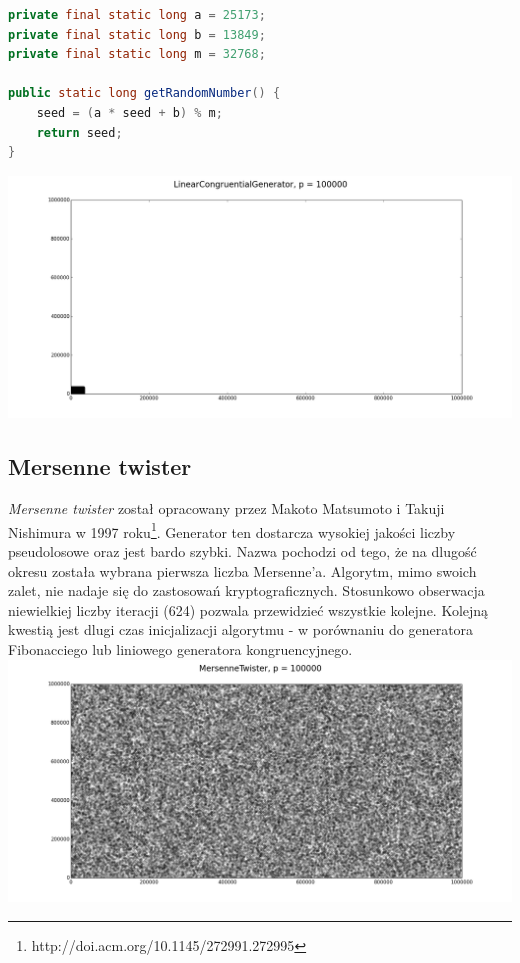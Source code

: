 \documentclass[a4paper, 11pt]{article} %
\begin{document}
\begin{lstlisting}[style=mystyle, language=java, frame=single, caption = Generowanie następnej liczby pseudolosowej przez LCG]
private final static long a = 25173;
private final static long b = 13849;
private final static long m = 32768;

public static long getRandomNumber() {
    seed = (a * seed + b) % m;
    return seed;
}
\end{lstlisting}
\includegraphics[width=\linewidth]{img/lcg-1.png}
\subsection{Mersenne twister}

\textit{Mersenne twister} został opracowany przez Makoto Matsumoto i Takuji Nishimura w 1997 roku\footnote{http://doi.acm.org/10.1145/272991.272995}. Generator ten dostarcza wysokiej jakości liczby pseudolosowe oraz jest bardo szybki. Nazwa pochodzi od tego, że na dlugość okresu została wybrana pierwsza liczba Mersenne'a. Algorytm, mimo swoich zalet, nie nadaje się do zastosowań kryptograficznych. Stosunkowo obserwacja niewielkiej liczby iteracji (624) pozwala przewidzieć wszystkie kolejne. Kolejną kwestią jest dlugi czas inicjalizacji algorytmu - w porównaniu do generatora Fibonacciego lub liniowego generatora kongruencyjnego. 
\includegraphics[width=\linewidth]{img/mt-1.png}
\end{document}
